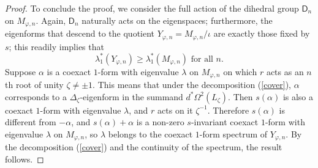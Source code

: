 \documentclass[11pt]{amsart}
\theoremstyle{definition}
\theoremstyle{remark}
\begin{document}
\begin{proof}
\par
To conclude the proof, we consider the full action of the dihedral group $\mathsf{D}_n$ on $M_{\varphi,n}$. Again, $\mathsf{D}_n$ naturally acts on the eigenspaces; furthermore, the eigenforms that descend to the quotient $Y_{\varphi,n}=M_{\varphi,n}/\iota$ are exactly those fixed by $s$; this readily implies that
\begin{equation*}
\lambda_1^*(Y_{\varphi,n})\geq \lambda_1^*(M_{\varphi,n}) \text{ for all }n.
\end{equation*}
Suppose $\alpha$ is a coexact $1$-form with eigenvalue $\lambda$ on $M_{\varphi,n}$ on which $r$ acts as an $n$th root of unity $\zeta\neq \pm1$. This means that under the decomposition (\ref{cover}), $\alpha$ corresponds to a $\Delta_\zeta$-eigenform in the summand $d^*\Omega^2(L_\zeta)$. Then $s(\alpha)$ is also a coexact $1$-form with eigenvalue $\lambda$, and $r$ acts on it $\zeta^{-1}$. Therefore $s(\alpha)$ is different from $-\alpha$, and $s(\alpha)+\alpha$ is a non-zero $s$-invariant coexact $1$-form with eigenvalue $\lambda$ on $M_{\varphi,n}$, so $\lambda$ belongs to the coexact $1$-form spectrum of $Y_{\varphi,n}$. By the decomposition (\ref{cover}) and the continuity of the spectrum, the result follows.
\end{proof}
\end{document}
